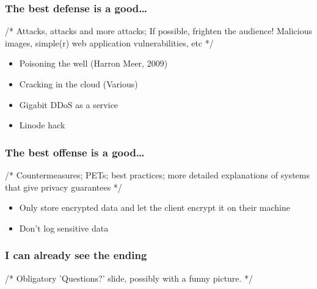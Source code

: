 \documentclass{beamer}
\begin{document}
\begin{frame}
    \frametitle{The best defense is a good\dots}
    /* Attacks, attacks and more attacks; If possible, frighten the audience!
    Malicious images, simple(r) web application vulnerabilities, etc */
    \begin{itemize}
      \item Poisoning the well (Harron Meer, 2009)
      \item Cracking in the cloud (Various) %
      \item Gigabit DDoS as a service %
      \item Linode hack
    \end{itemize}
\end{frame}

\begin{frame}
    \frametitle{The best offense is a good\dots}
    /* Countermeasures; PETs; best practices; more detailed explanations of
    systems that give privacy guarantees */
    \begin{itemize}
      \item Only store encrypted data and let the client encrypt it on their machine
      \item Don't log sensitive data
    \end{itemize}
\end{frame}

\begin{frame}
    \frametitle{I can already see the ending}
    /* Obligatory 'Questions?' slide, possibly with a funny picture. */
\end{frame}
\end{document}
